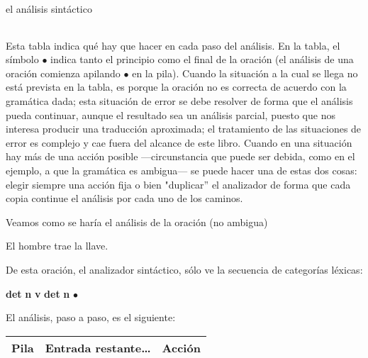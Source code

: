 \begin{persabermes}{el análisis sintáctico}
\begin{center}
\begin{tabular}{l|l|l}
\end{tabular} \end{center} 

Esta tabla indica qué hay que hacer en cada paso del análisis. En la tabla, el símbolo $\bullet$ indica tanto el principio como el final de la oración (el análisis de una oración comienza apilando $\bullet$ en la pila). Cuando la situación a la cual se llega no está prevista en la tabla, es porque la oración no es correcta de acuerdo con la gramática dada; esta situación de error se debe resolver de forma que el análisis pueda continuar, aunque el resultado sea un análisis parcial, puesto que nos interesa producir una traducción aproximada; el tratamiento de las situaciones de error es complejo y cae fuera del alcance de este libro. Cuando en una situación hay más de una acción posible ---circunstancia que puede ser debida, como en el ejemplo, a que la gramática es ambigua--- se puede hacer una de estas dos cosas: elegir siempre una acción fija o bien "duplicar'' el analizador de forma que cada copia continue el análisis por cada uno de los caminos. 

Veamos como se haría el análisis de la oración (no ambigua) \begin{example} El hombre trae la llave. \end{example} De esta oración, el analizador sintáctico, sólo ve la secuencia de categorías léxicas: \begin{example} \textbf{det} \textbf{n} \textbf{v} \textbf{det} \textbf{n} \mbox{$\bullet$} \end{example} El análisis, paso a paso, es el siguiente: \begin{center} \begin{tabular}{l|r|l} \hline

Pila &Entrada restante\ldots &Acción \\ \hline


\end{tabular}
\end{center}
\end{persabermes}
